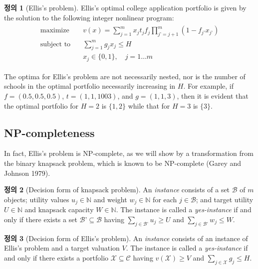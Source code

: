 \documentclass[12pt]{article} %
\theoremstyle{definition}
\newtheorem{definition}{Definition}
\theoremstyle{definition}
\newtheorem{definition}{정의}
\begin{document}
\begin{definition}[Ellis's problem]
Ellis's optimal college application portfolio is given by the solution to the following integer nonlinear program:
\begin{align}
\begin{split}
\text{maximize}\quad & v(x) = \sum_{j=1}^m x_j t_j f_j \prod_{j’ = j+1}^m (1 - f_{j’} x_{j’}) \\
\text{subject to}\quad & \sum_{j=1}^m g_j x_j \leq H \\
&x_j \in \{0, 1\}, \quad j = 1\dots m
\end{split}
\end{align}
\end{definition}

The optima for Ellis's problem are not necessarily nested, nor is the number of schools in the optimal portfolio necessarily increasing in $H$. For example, if
$f = (0.5, 0.5, 0.5)$, $t = (1, 1, 1003)$, and $g = (1, 1, 3)$,
then it is evident that the optimal portfolio for $H = 2$ is $\{1, 2\}$ while that for $H = 3$ is $\{3\}$. 

\subsection{NP-completeness}
In fact, Ellis’s problem is NP-complete, as we will show by a transformation from the binary knapsack problem, which is known to be NP-complete (Garey and Johnson 1979).

\begin{definition}[Decision form of knapsack problem]
An \emph{instance} consists of a set $\mathcal{B}$ of $m$ objects; utility values $u_j \in \mathbb{N}$ and weight $w_j \in \mathbb{N}$ for each $j \in \mathcal{B}$; and target utility $U\in \mathbb{N}$ and knapsack capacity $W\in \mathbb{N}$. The instance is called a \emph{yes-instance} if and only if there exists a set $\mathcal{B’} \subseteq \mathcal{B}$ having $\sum_{j \in \mathcal{B’}} u_j \geq U$ and  $\sum_{j \in \mathcal{B’}} w_j \leq W$.
\end{definition}

\begin{definition}[Decision form of Ellis’s problem]
An \emph{instance} consists of an instance of Ellis’s problem and a target valuation $V$. The instance is called a \emph{yes-instance} if and only if there exists a portfolio $\mathcal{X} \subseteq \mathcal{C}$ having $v(\mathcal{X}) \geq V$ and  $\sum_{j \in \mathcal{X}} g_j \leq H$.
\end{definition}
\end{document}
